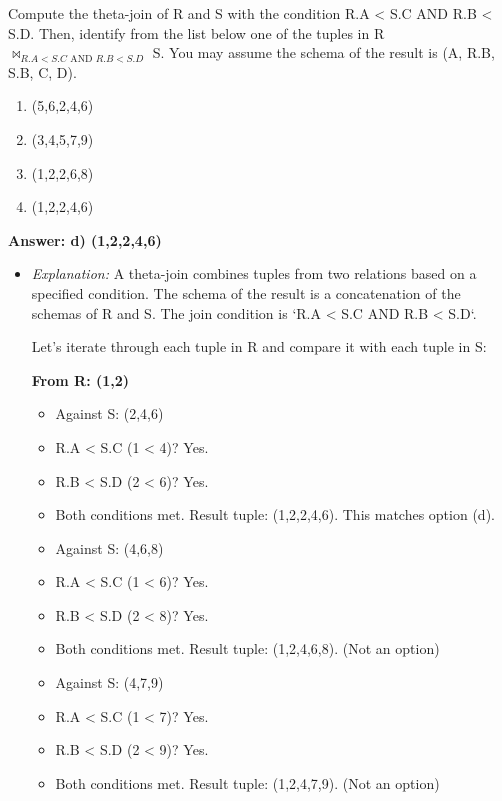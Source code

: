 \documentclass{article}
\begin{document}
\begin{enumerate}[label=\textbf{Question \arabic*.}]
        Compute the theta-join of R and S with the condition R.A < S.C AND R.B < S.D. Then, identify from the list below one of the tuples in R $\Join_{R.A<S.C \text{ AND } R.B<S.D}$ S. You may assume the schema of the result is (A, R.B, S.B, C, D).
        \begin{enumerate}[label=\alph*)]
            \item (5,6,2,4,6)
            \item (3,4,5,7,9)
            \item (1,2,2,6,8)
            \item (1,2,2,4,6)
        \end{enumerate}
        \textbf{Answer: d) (1,2,2,4,6)}
        \begin{itemize}
            \item \textit{Explanation:} A theta-join combines tuples from two relations based on a specified condition. The schema of the result is a concatenation of the schemas of R and S. The join condition is `R.A < S.C AND R.B < S.D`.
    
            Let's iterate through each tuple in R and compare it with each tuple in S:
    
            \textbf{From R: (1,2)}
            \begin{itemize}
                \item Against S: (2,4,6)
                    \item R.A < S.C (1 < 4)? Yes.
                    \item R.B < S.D (2 < 6)? Yes.
                    \item Both conditions met. Result tuple: (1,2,2,4,6). This matches option (d).
    
                \item Against S: (4,6,8)
                    \item R.A < S.C (1 < 6)? Yes.
                    \item R.B < S.D (2 < 8)? Yes.
                    \item Both conditions met. Result tuple: (1,2,4,6,8). (Not an option)
    
                \item Against S: (4,7,9)
                    \item R.A < S.C (1 < 7)? Yes.
                    \item R.B < S.D (2 < 9)? Yes.
                    \item Both conditions met. Result tuple: (1,2,4,7,9). (Not an option)
            \end{itemize}
    

\end{itemize}
\end{enumerate}
\end{document}
